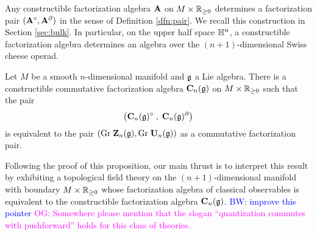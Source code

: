 \documentclass[11pt]{amsart}
\numberwithin{equation}{section}
\def\brian{\textcolor{blue}{BW: }\textcolor{blue}}
\def\owen{\textcolor{magenta}{OG: }\textcolor{magenta}}
\begin{document}
Any constructible factorization algebra $\mathbf A$ on $M \times \mathbb R_{\geq 0}$ determines a factorization pair $(\mathbf A^\circ , \mathbf A^{\partial})$ in the sense of Definition \ref{dfn:pair}.
We recall this construction in Section \ref{sec:bulk}. 
In particular, on the upper half space $\mathbb H^n$, a constructible factorization algebra determines an algebra over the $(n+1)$-dimensional Swiss cheese operad. 


\begin{prp}
\label{prp:pair}
Let $M$ be a smooth $n$-dimensional manifold and $\mathfrak g$ a Lie algebra. 
There is a constructible commutative factorization algebra ${\bf C}_n (\mathfrak g)$
on $M \times \mathbb R_{\geq 0}$ such that the pair 
\[
\left( {\bf C}_n (\mathfrak g)^\circ \; , \; {\bf C}_n (\mathfrak g)^\partial \right)
\]
is equivalent to the pair $({\rm Gr} \; \mathbf Z_n(\mathfrak g), {\rm Gr} \; \mathbf U_n(\mathfrak g))$ as a commutative factorization pair.
\end{prp}


Following the proof of this proposition, our main thrust is to interpret this result by exhibiting a topological field theory on the $(n+1)$-dimensional manifold with boundary $M \times \mathbb R_{\geq 0}$ whose factorization algebra of classical observables is equivalent to the constructible factorization algebra $\mathbf C_n(\mathfrak g)$. 
\brian{improve this pointer}
\owen{Somewhere please mention that the slogan ``quantization commutes with pushforward'' holds for this class of theories.}

%
\end{document}
